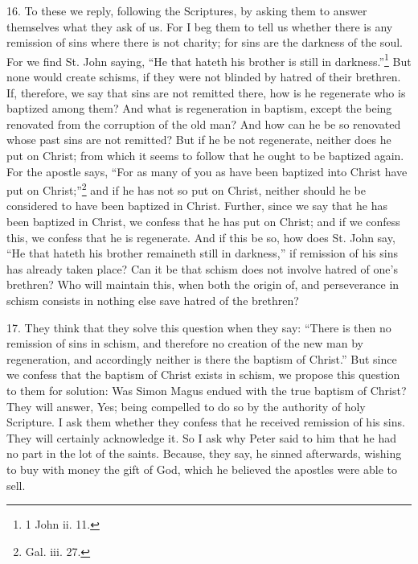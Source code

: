 16. To these we reply, following the Scriptures, by asking them to answer themselves what they ask of us. For I beg them to tell us whether there is any remission of sins where there is not charity; for sins are the darkness of the soul. For we find St. John saying, ``He that hateth his brother is still in darkness.''\footnote{\par  1 John ii. 11.} But none would create schisms, if they were not blinded by hatred of their brethren. If, therefore, we say that sins are not remitted there, how is he regenerate who is baptized among them? And what is regeneration in baptism, except the being renovated from the corruption of the old man? And how can he be so renovated whose past sins are not remitted? But if he be not regenerate, neither does he put on Christ; from which it seems to follow that he ought to be baptized again. For the apostle says, ``For as many of you as have been baptized into Christ have put on Christ;''\footnote{\par  Gal. iii. 27.} and if he has not so put on Christ, neither should he be considered to have been baptized in Christ. Further, since we say that he has been baptized in Christ, we confess that he has put on Christ; and if we confess this, we confess that he is regenerate. And if this be so, how does St. John say, ``He that hateth his brother remaineth still in darkness,'' if remission of his sins has already taken place? Can it be that schism does not involve hatred of one’s brethren? Who will maintain this, when both the origin of, and perseverance in schism consists in nothing else save hatred of the brethren?

17. They think that they solve this question when they say: ``There is then no remission of sins in schism, and therefore no creation of the new man by regeneration, and accordingly neither is there the baptism of Christ.'' But since we confess that the baptism of Christ exists in schism, we propose this question to them for solution: Was Simon Magus endued with the true baptism of Christ? They will answer, Yes; being compelled to do so by the authority of holy Scripture. I ask them whether they confess that he received remission of his sins. They will certainly acknowledge it. So I ask why Peter said to him that he had no part in the lot of the saints. Because, they say, he sinned afterwards, wishing to buy with money the gift of God, which he believed the apostles were able to sell.


